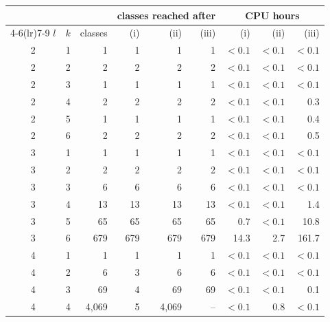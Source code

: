 \begin{tabular}{c c r r r r r r r}
\toprule
 & & & \multicolumn{3}{c}{classes reached after} & \multicolumn{3}{c}{CPU hours} \\
\cmidrule(lr){4-6}\cmidrule(lr){7-9}
$l$ & $k$ & classes & (i) & (ii) & (iii) & (i) & (ii) & (iii) \\
\midrule
2 & 1 & 1 & 1 & 1 & 1 & $<0.1$ & $<0.1$ & $<0.1$ \\
2 & 2 & 2 & 2 & 2 & 2 & $<0.1$ & $<0.1$ & $<0.1$ \\
2 & 3 & 1 & 1 & 1 & 1 & $<0.1$ & $<0.1$ & $<0.1$ \\
2 & 4 & 2 & 2 & 2 & 2 & $<0.1$ & $<0.1$ & 0.3 \\
2 & 5 & 1 & 1 & 1 & 1 & $<0.1$ & $<0.1$ & 0.4 \\
2 & 6 & 2 & 2 & 2 & 2 & $<0.1$ & $<0.1$ & 0.5 \\
3 & 1 & 1 & 1 & 1 & 1 & $<0.1$ & $<0.1$ & $<0.1$ \\
3 & 2 & 2 & 2 & 2 & 2 & $<0.1$ & $<0.1$ & $<0.1$ \\
3 & 3 & 6 & 6 & 6 & 6 & $<0.1$ & $<0.1$ & $<0.1$ \\
3 & 4 & 13 & 13 & 13 & 13 & $<0.1$ & $<0.1$ & 1.4 \\
3 & 5 & 65 & 65 & 65 & 65 & 0.7 & $<0.1$ & 10.8 \\
3 & 6 & 679 & 679 & 679 & 679 & 14.3 & 2.7 & 161.7 \\
4 & 1 & 1 & 1 & 1 & 1 & $<0.1$ & $<0.1$ & $<0.1$ \\
4 & 2 & 6 & 3 & 6 & 6 & $<0.1$ & $<0.1$ & $<0.1$ \\
4 & 3 & 69 & 4 & 69 & 69 & $<0.1$ & $<0.1$ & 0.1 \\
4 & 4 & 4{,}069 & 5 & 4{,}069 & -- & $<0.1$ & 0.8 & $<0.1$ \\
\bottomrule
\end{tabular}
